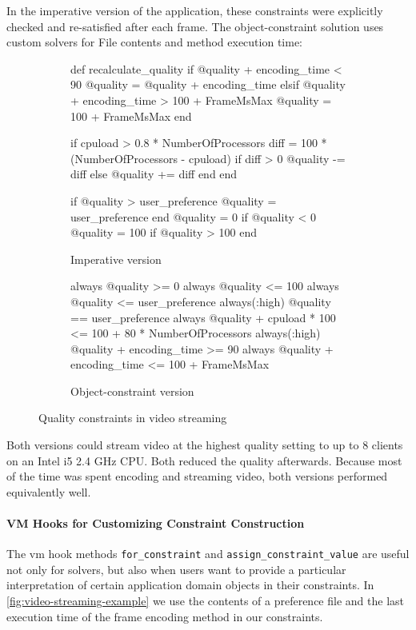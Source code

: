 In the imperative version of the application, these constraints were
explicitly checked and re-satisfied after each frame. The
object-constraint solution uses custom solvers for File contents and
method execution time:
\begin{figure}[h!]
  \begin{subfigure}[b]{0.48\textwidth}
    \begin{code}[basicstyle=\scriptsize,frame=none]
def recalculate_quality
  if @quality + encoding_time < 90
    @quality = @quality + encoding_time
  elsif @quality + encoding_time > 100 + FrameMsMax
    @quality = 100 + FrameMsMax
  end

  if cpuload > 0.8 * NumberOfProcessors
    diff = 100 * (NumberOfProcessors - cpuload)
    if diff > 0
      @quality -= diff
    else
      @quality += diff
    end
  end

  if @quality > user_preference
    @quality = user_preference
  end
  @quality = 0 if @quality < 0
  @quality = 100 if @quality > 100
end
    \end{code}
    \caption{Imperative version}
  \end{subfigure}
  \begin{subfigure}[b]{0.52\textwidth}
    \centering
    \begin{code}[basicstyle=\scriptsize,frame=none]
always { @quality >= 0 }
always { @quality <= 100 }
always { @quality <= user_preference }
always(:high) { @quality == user_preference }
always { @quality + cpuload * 100 <=
             100 + 80 * NumberOfProcessors }
always(:high) { @quality + encoding_time >= 90 }
always { @quality + encoding_time <=
             100 + FrameMsMax }
    \end{code}
    \caption{Object-constraint version}
  \end{subfigure}
  \caption{Quality constraints in video streaming}
  \label{fig:video-streaming-example}
\end{figure}

Both versions could stream video at the highest quality setting to up
to 8 clients on an Intel i5 2.4 GHz CPU. Both reduced the quality
afterwards. Because most of the time was spent encoding and streaming
video, both versions performed equivalently well.

\paragraph{VM Hooks for Customizing Constraint Construction}
The \ac{vm} hook methods \lstinline{for_constraint} and
\lstinline{assign_constraint_value} are useful not only for solvers,
but also when users want to provide a particular interpretation of
certain application domain objects in their constraints. In
\autoref{fig:video-streaming-example} we use the contents of a
preference file and the last execution time of the frame encoding
method in our constraints.

